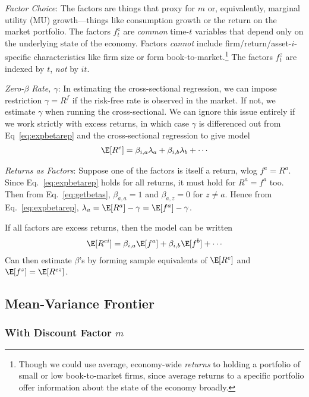 \documentclass[12pt]{article}
\theoremstyle{plain}
\theoremstyle{definition}
\theoremstyle{remark}
\begin{document}
\begin{multicols*}{2}
\emph{Factor Choice}: The factors are things that proxy for $m$ or,
equivalently, marginal utility (MU) growth---things like consumption
growth or the return on the market portfolio.
The factors $f_t^z$ are \emph{common} time-$t$ variables that depend
only on the underlying state of the economy. Factors \emph{cannot}
include firm/return/asset-$i$-specific characteristics like firm size or
form book-to-market.\footnote{%
  Though we could use average, economy-wide \emph{returns} to holding a
  portfolio of small or low book-to-market firms, since average
  returns to a specific portfolio offer information about the state of
  the economy broadly.
}
The factors $f^z_t$ are indexed by $t$, \emph{not} by $it$.

\emph{Zero-$\beta$ Rate, $\gamma$}:
In estimating the cross-sectional regression, we can impose restriction
$\gamma=R^f$ if the risk-free rate is observed in the market.
If not, we estimate $\gamma$ when running the cross-sectional.
We can ignore this issue entirely if we work strictly with excess
returns, in which case $\gamma$ is differenced out from
Eq~\ref{eq:expbetarep} and the cross-sectional regression to give model
\begin{align}
  \E[R^e]
  = \beta_{i,a}\lambda_a + \beta_{i,b} \lambda_b + \cdots
\end{align}

\emph{Returns as Factors}:
Suppose one of the factors is itself a return, wlog $f^a=R^a$.
Since Eq.~\ref{eq:expbetarep} holds for all returns, it must hold for
$R^a=f^a$ too. Then from Eq.~\ref{eq:getbetas}, $\beta_{a,a}=1$ and
$\beta_{a,z}=0$ for $z\neq a$.  Hence from Eq.~\ref{eq:expbetarep},
$\lambda_a=\E[R^a]-\gamma=\E[f^a]-\gamma$.

If all factors are excess returns, then the model can be written
\begin{align}
  \E[R^{ei}]
  = \beta_{i,a}\E[f^a] + \beta_{i,b} \E[f^b] + \cdots
\end{align}
Can then estimate $\beta$'s by forming sample equivalents of $\E[R^e]$
and $\E[f^z]=\E[R^{ez}]$.


\clearpage
\subsection{Mean-Variance Frontier}

\subsubsection{With Discount Factor $m$}


\end{multicols*}
\end{document}
